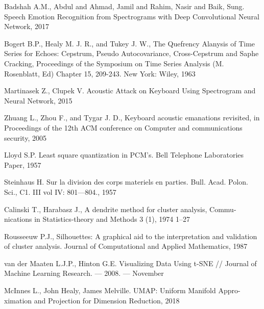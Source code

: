 
\begin{thebibliography}{17}
    \setlength{\leftskip}{-0.85cm}
    \setlength{\itemindent}{2.1cm}
    
     Badshah A.M., Abdul and Ahmad, Jamil and Rahim, Nasir and Baik, Sung. Speech Emotion Recognition from Spectrograms with Deep Convolutional Neural Network, 2017  

     Bogert B.P., Healy M. J. R., and Tukey J. W., The Quefrency Alanysis of Time Series for Echoes: Cepstrum, Pseudo Autocovariance, Cross-Cepstrum and Saphe Cracking, Proceedings of the Symposium on Time Series Analysis (M. Rosenblatt, Ed) Chapter 15, 209-243. New York: Wiley, 1963

     Martinasek Z., Clupek V. Acoustic Attack on Keyboard Using Spectrogram and Neural Network, 2015

     Zhuang L., Zhou F., and Tygar J. D., Keyboard acoustic emanations revisited, in Proceedings of the 12th ACM conference on Computer and communications security, 2005

     Lloyd S.P. Least square quantization in PCM’s. Bell Telephone Laboratories Paper, 1957

     Steinhaus H. Sur la division des corps materiels en parties. Bull. Acad. Polon. Sci., C1. III vol IV: 801—804., 1957

     Calinski T., Harabasz J., A dendrite method for cluster analysis, Commu-nications in Statistics-theory and Methods 3 (1), 1974 1–27

     Rousseeuw P.J., Silhouettes: A graphical aid to the interpretation and validation of cluster analysis. Journal of Computational and Applied Mathematics, 1987

     van der Maaten L.J.P., Hinton G.E. Visualizing Data Using t-SNE // Journal of Machine Learning Research. — 2008. — November

     McInnes L., John Healy, James Melville. UMAP: Uniform Manifold Appro-ximation and Projection for Dimension Reduction, 2018


\end{thebibliography}
